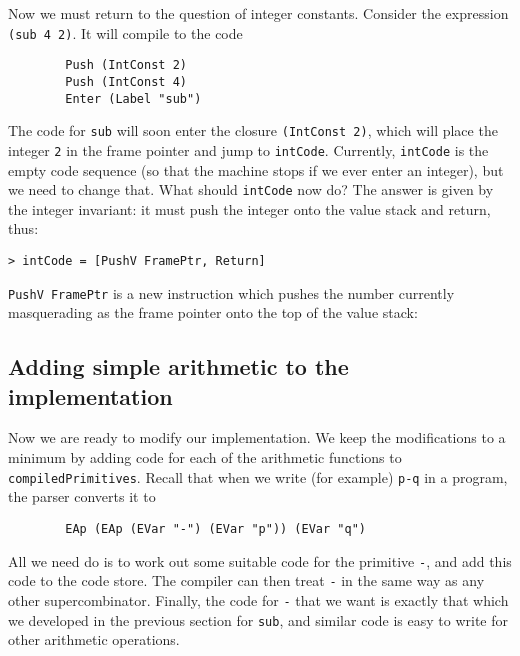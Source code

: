 Now we must return to the question of integer constants.  Consider the
expression \mbox{\tt (sub\ 4\ 2)}.  It will compile to the code
\begin{verbatim}
        Push (IntConst 2)
        Push (IntConst 4)
        Enter (Label "sub")
\end{verbatim}
The code for \mbox{\tt sub} will soon enter the closure \mbox{\tt (IntConst\ 2)}, which will
place the integer \mbox{\tt 2} in the frame pointer and jump to \mbox{\tt intCode}.
Currently, \mbox{\tt intCode} is the empty code sequence (so that the machine stops
if we ever enter an integer), but we need to change that.
What should \mbox{\tt intCode} now do?  The answer is given by the integer invariant:
it must push the integer onto the value stack and return, thus:
\begin{verbatim}
> intCode = [PushV FramePtr, Return]
\end{verbatim}
%
\par
\mbox{\tt PushV\ FramePtr} is a new instruction which pushes the number currently
masquerading as the frame pointer onto the top of the value stack:
\timruleV
{}
{}

\subsection{Adding simple arithmetic to the implementation}

Now we are ready to modify our implementation.
We keep the modifications to a minimum by adding code for each of the
arithmetic functions to \mbox{\tt compiledPrimitives}.  Recall that when we write
(for example)
\mbox{\tt p-q} in a program, the parser converts it to
\begin{verbatim}
        EAp (EAp (EVar "-") (EVar "p")) (EVar "q")
\end{verbatim}
All we need do is
to work out some suitable code for the primitive
\mbox{\tt -}, and add this code to the code store.
The compiler can then treat \mbox{\tt -} in the same way as any other supercombinator.
Finally, the code for \mbox{\tt -} that we want
is exactly that which we developed in the
previous section for \mbox{\tt sub}, and similar code is easy to write for other
arithmetic operations.

